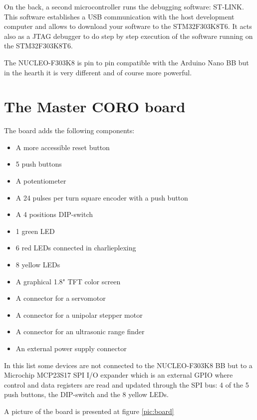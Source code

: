 \documentclass[11pt]{report}
\begin{document}
On the back, a second microcontroller runs the debugging software: ST-LINK. This software establishes a USB communication with the host development computer and allows to download your software to the STM32F303K8T6. It acts also as a JTAG debugger to do step by step execution of the software running on the STM32F303K8T6.

The NUCLEO-F303K8 is pin to pin compatible with the Arduino Nano BB but in the hearth it is very different and of course more powerful. 

\section{The Master CORO board}

The board adds the following components:
\begin{itemize}
\setlength\itemsep{-.2em}
\item{A more accessible reset button}
\item{5 push buttons}
\item{A potentiometer}
\item{A 24 pulses per turn square encoder with a push button}
\item{A 4 positions DIP-switch}
\item{1 green LED}
\item{6 red LEDs connected in charlieplexing}
\item{8 yellow LEDs}
\item{A graphical 1.8" TFT color screen}
\item{A connector for a servomotor}
\item{A connector for a unipolar stepper motor}
\item{A connector for an ultrasonic range finder}
\item{An external power supply connector}
\end{itemize}

In this list some devices are not connected to the NUCLEO-F303K8 BB but to a Microchip MCP23S17 SPI I/O expander which is an external GPIO where control and data registers are read and updated through the SPI bus: 4 of the 5 push buttons, the DIP-switch and the 8 yellow LEDs.

A picture of the board is presented at figure \ref{pic:board}
\end{document}

